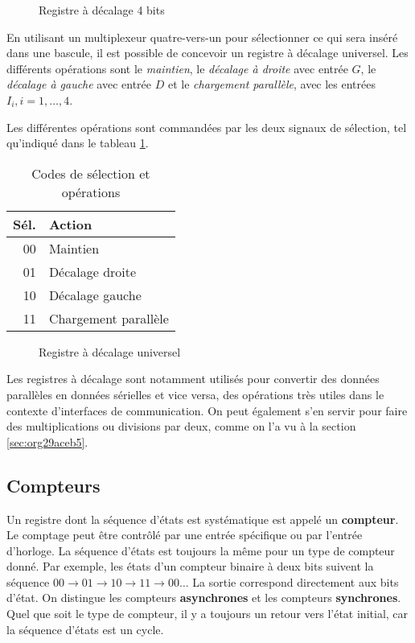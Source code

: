 \documentclass[11pt]{article}
\begin{document}
\begin{figure}[htbp]
\centering

\caption{\label{fig:orga7d1c65}Registre à décalage 4 bits}
\end{figure}

En utilisant un multiplexeur quatre-vers-un pour sélectionner ce qui
sera inséré dans une bascule, il est possible de concevoir un registre
à décalage universel. Les différents opérations sont le \emph{maintien}, le
\emph{décalage à droite} avec entrée \(G\), le \emph{décalage à gauche} avec entrée
\(D\) et le \emph{chargement parallèle}, avec les entrées \(I_i, i=1, \ldots,
4\).

Les différentes opérations sont commandées par les deux signaux de
sélection, tel qu'indiqué dans le tableau \ref{tab:orgc611b01}.

\begin{table}[htbp]
\caption{\label{tab:orgc611b01}Codes de sélection et opérations}
\centering
\begin{tabular}{rl}
Sél. & Action\\
\hline
00 & Maintien\\
01 & Décalage droite\\
10 & Décalage gauche\\
11 & Chargement parallèle\\
\end{tabular}
\end{table}

\begin{figure}[htbp]
\centering

\caption{\label{fig:org1bee0d3}Registre à décalage universel}
\end{figure} 

Les registres à décalage sont notamment utilisés pour convertir des
données parallèles en données sérielles et vice versa, des opérations
très utiles dans le contexte d'interfaces de communication. On peut
également s'en servir pour faire des multiplications ou divisions par
deux, comme on l'a vu à la section \ref{sec:org29aceb5}.



\subsection{Compteurs}
\label{sec:org0ceeec3}

Un registre dont la séquence d'états est systématique est appelé un
\textbf{compteur}. Le comptage peut être contrôlé par une entrée spécifique
ou par l'entrée d'horloge. La séquence d'états est toujours la même
pour un type de compteur donné. Par exemple, les états d'un compteur
binaire à deux bits suivent la séquence \(00 \rightarrow 01
\rightarrow 10 \rightarrow 11 \rightarrow 00 \ldots\) La sortie
correspond directement aux bits d'état. On distingue les compteurs
\textbf{asynchrones} et les compteurs \textbf{synchrones}. Quel que soit le type de
compteur, il y a toujours un retour vers l'état initial, car la
séquence d'états est un cycle.
\end{document}
